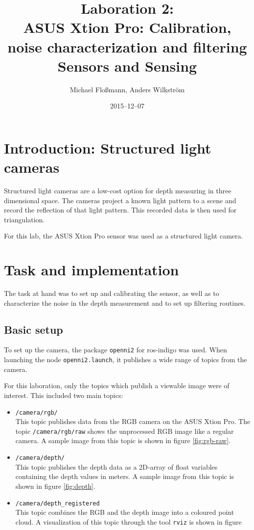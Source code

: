 \documentclass[DIV12,a4paper]{scrartcl}
\title{Laboration 2:\\ ASUS Xtion Pro: Calibration, noise characterization and filtering\\{\small Sensors and Sensing}}
\author{Michael Flo{\ss}mann, Anders Wilkstr\"om}
\date{2015--12--07}
\begin{document}
\maketitle

\section{Introduction: Structured light cameras}
Structured light cameras are a low-cost option for depth measuring in three dimensional space. The cameras project a known light pattern to a scene and record the reflection of that light pattern. This recorded data is then used for triangulation.\par
For this lab, the ASUS Xtion Pro sensor was used as a structured light camera.
\section{Task and implementation}
The task at hand was to set up and calibrating the sensor, as well as to characterize the noise in the depth measurement and to set up filtering routines.
\subsection{Basic setup}
To set up the camera, the package \texttt{openni2} for ros-indigo was used. When launching the node \texttt{openni2.launch}, it publishes a wide range of topics from the camera.\par %
For this laboration, only the topics which publish a viewable image were of interest. This included two main topics:%

\begin{itemize}
  \item \texttt{/camera/rgb/}\\
    This topic publishes data from the RGB camera on the ASUS Xtion Pro. The topic \texttt{/camera/rgb/raw} shows the unprocessed RGB image like a regular camera. A sample image from this topic is shown in figure \ref{fig:rgb-raw}. %
  \item \texttt{/camera/depth/}\\
    This topic publishes the depth data as a 2D-array of float variables containing the depth values in meters. A sample image from this topic is shown in figure \ref{fig:depth}.
  \item \texttt{/camera/depth\_registered}\\
    This topic combines the RGB and the depth image into a coloured point cloud. A visualization of this topic through the tool \texttt{rviz} is shown in figure 
\end{itemize}
\end{document}
